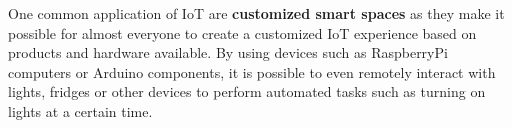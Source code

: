 \documentclass[runningheads]{llncs}
\begin{document}





One common application of IoT are \textbf{customized smart spaces} as they make it possible for almost everyone to create a customized IoT experience based on products and hardware available. By using devices such as RaspberryPi computers or Arduino components, it is possible to even remotely interact with lights, fridges or other devices to perform automated tasks such as turning on lights at a certain time.
\end{document}
